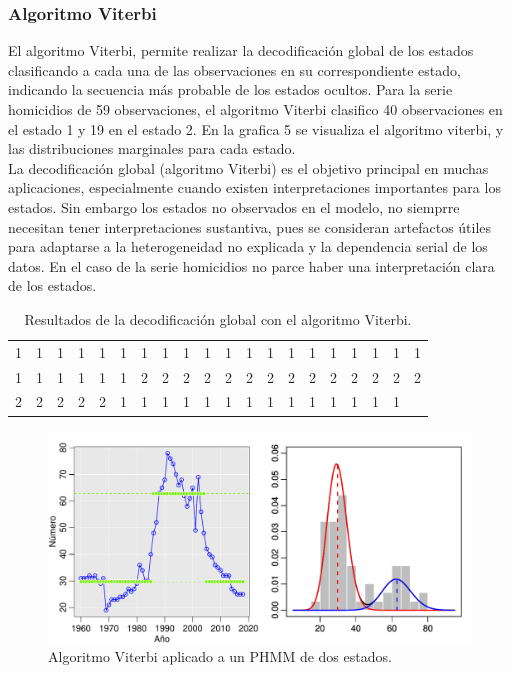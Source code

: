 \documentclass[a4paper]{article}\usepackage[]{graphicx}\usepackage[]{color}
\makeatletter
\def\maxwidth{ %
  \ifdim\Gin@nat@width>\linewidth
    \linewidth
  \else
    \Gin@nat@width
  \fi
}
\newenvironment{knitrout}{}{} %
\makeatother
\begin{document}
\subsubsection*{Algoritmo Viterbi}

El algoritmo Viterbi, permite realizar la decodificación global de los estados clasificando a cada una de las observaciones en su correspondiente estado, indicando la secuencia más probable de los estados ocultos. Para la serie homicidios de 59 observaciones, el algoritmo Viterbi clasifico 40 observaciones en el estado 1 y 19 en el estado 2. En la grafica 5 se visualiza el algoritmo viterbi, y las distribuciones marginales para cada estado.
\\
La decodificación global (algoritmo Viterbi) es el objetivo principal en muchas aplicaciones, especialmente cuando existen interpretaciones importantes para los estados. Sin embargo los estados no observados en el modelo, no siemprre necesitan tener interpretaciones sustantiva, pues se consideran artefactos útiles para adaptarse a la heterogeneidad no explicada y la dependencia serial de los datos. En el caso de la serie homicidios no parce haber una interpretación clara de los estados.

\begin{table}[ht]
\centering
\begin{tabular}{rrrrrrrrrrrrrrrrrrrr}
  \hline
  \hline
1 & 1 & 1 & 1 & 1 & 1 & 1 & 1 & 1 & 1 & 1 & 1 & 1 & 1 & 1 & 1 & 1 & 1 & 1 & 1 \\ 
  1 & 1 & 1 & 1 & 1 & 1 & 2 & 2 & 2 & 2 & 2 & 2 & 2 & 2 & 2 & 2 & 2 & 2 & 2 & 2 \\ 
  2 & 2 & 2 & 2 & 2 & 1 & 1 & 1 & 1 & 1 & 1 & 1 & 1 & 1 & 1 & 1 & 1 & 1 & 1 &  \\ 
   \hline
\end{tabular}
\caption{Resultados de la decodificación global con el algoritmo Viterbi.} 
\end{table}


\begin{knitrout}
\color{fgcolor}\begin{figure}
\includegraphics[width=\maxwidth]{figure/unnamed-chunk-19-1} \caption[Algoritmo Viterbi aplicado a un PHMM de dos estados]{Algoritmo Viterbi aplicado a un PHMM de dos estados.}\label{fig:unnamed-chunk-19}
\end{figure}


\end{knitrout}
\end{document}
